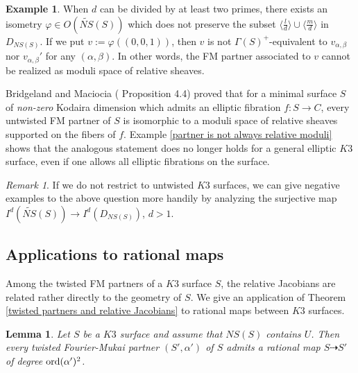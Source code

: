 \documentclass{article}
\theoremstyle{plain}
\newtheorem{lemma}[theorem]{Lemma}%
\theoremstyle{definition}
\newtheorem{example}[theorem]{Example}%
\theoremstyle{remark}
\newtheorem{remark}{Remark}%
\begin{document}
\begin{example}
When  $d$ can be divided by at least two primes,  
there exists an isometry $\varphi \in O(\widetilde{NS}(S))$ 
which does not preserve the subset 
$\langle \frac{l}{d} \rangle \cup \langle \frac{m}{d} \rangle $  
in $D_{NS(S)}$.   
If we put $v := \varphi ((0, 0, 1))$,  
then $v$ is not $\Gamma (S)^{+}$-equivalent to 
$ v_{\alpha , \beta}$ nor  $v_{\alpha , \beta}'$  
for any $(\alpha , \beta )$.  
In other words, 
the FM partner associated to $v$ cannot be 
realized as moduli space of relative sheaves.   
\end{example}




Bridgeland and Maciocia (\cite{B-M} Proposition 4.4) proved that     
for a minimal surface $S$ of {\it non-zero\/} Kodaira dimension which admits an elliptic fibration $f : S \to C$,  
every untwisted FM partner of $S$ is isomorphic to a moduli space of relative sheaves supported on the fibers of $f$.     
Example \ref{partner is not always relative moduli}  
shows that the analogous statement does no longer holds 
for a general elliptic $K3$ surface, 
even if one allows all elliptic fibrations on the surface.  





\begin{remark}
If we do not restrict to untwisted $K3$ surfaces,  
we can give negative examples to the above question more handily  
by analyzing the surjective map 
$I^{d}(\widetilde{NS}(S)) \to I^{d}(D_{NS(S)})$, $d>1$.
\end{remark}





\subsection{Applications to rational maps}\label{sec4.2}





Among the twisted FM partners of a $K3$ surface $S$,   
the relative Jacobians are related rather directly to the geometry of $S$.   
We give an application of Theorem \ref{twisted partners and relative Jacobians} 
to rational maps between $K3$ surfaces.   


\begin{lemma}\label{rational map to twisted FM partner}
Let $S$ be a $K3$ surface and 
assume that $NS(S)$ contains $U$. 
Then every twisted Fourier-Mukai partner 
$(S' , \alpha ')$ of $S$ 
admits a rational map $S \dashrightarrow  S'$ 
of degree ${\rm ord\/}(\alpha ')^{2}$. 
\end{lemma}
\end{document}
